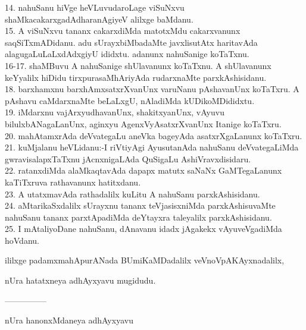 \documentclass{article}
\begin{document}
14. nahuSanu hiVge heVLuvudaroLage viSuNxvu shaMkacakarxgadAdharanAgiyeV alilxge baMdanu.\\
15. A viSuNxvu tananx cakarxdiMda matotxMdu cakarxvanunx saqSiTxmADidanu. adu sUrayxbiMbadaMte javxlisutAtx haritavAda alagugaLuLaLxdAdxgiyU ididxtu. adanunx nahuSanige koTaTxnu.\\
16-17. shaMBuvu A nahuSanige shUlavanunx koTaTxnu. A shUlavanunx keYyalilx hiDidu tirxpurasaMhAriyAda rudarxnaMte parxkAshisidanu.\\
18. barxhamxnu barxhAmxsatxrXvanUnx varuNanu pAshavanUnx koTaTxru. A pAshavu caMdarxnaMte beLaLxgU, nAladiMda kUDikoMDididxtu.\\
19. iMdarxnu vajArxyudhavanUnx, shakitxyanUnx, vAyuvu bilulxbANagaLanUnx, aginxyu AgenxVyAsatxrXvanUnx Itanige koTaTxru.\\
20. mahAtamxrAda deVvategaLu aneVka bageyAda asatxrXgaLanunx koTaTxru.\\
21. kuMjalanu heVLidanu:-I riVtiyAgi AyusutanAda nahuSanu deVvategaLiMda gwravisalapxTaTxnu jAcnxnigaLAda QuSigaLu AshiVravxdisidaru.\\
22. ratanxdiMda alaMkaqtavAda dapapx matutx saNaNx GaMTegaLanunx kaTiTxruva rathavanunx hatitxdanu.\\
23. A utatxmavAda rathadalilx kuLitu A nahuSanu parxkAshisidanu.\\
24. aMtarikaSxdalilx sUrayxnu tananx teVjasisxniMda parxkAshisuvaMte nahuSanu tananx parxtApadiMda deYtayxra taleyalilx parxkAshisidanu.\\
25. I mAtaliyoDane nahuSanu, dAnavanu idadx jAgakekx vAyuveVgadiMda hoVdanu.

\begin{center}
ililxge padamxmahApurANada BUmiKaMDadalilx veVnoVpAKAyxnadalilx,
\end{center}

\begin{center}
nUra hatatxneya adhAyxyavu mugidudu.
\end{center}

\begin{center}
---------------
\end{center}

\begin{center}
nUra hanonxMdaneya adhAyxyavu
\end{center}
\end{document}
